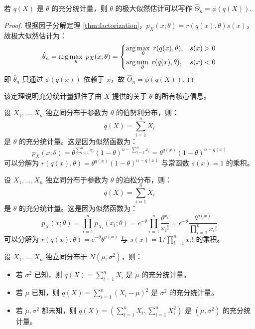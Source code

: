 \begin{theorem}
若 $q(X)$ 是 $\theta$ 的充分统计量，则 $\theta$ 的极大似然估计可以写作 $\hat\Theta_n=\phi(q(X))$.
\end{theorem}
\begin{proof}
根据因子分解定理 \ref{thm:factorization}，$p_X(x;\theta)=r(q(x),\theta)s(x)$，故极大似然估计为：
\[
\hat\theta_n=\arg\max_\theta\;p_X(x;\theta)=\begin{dcases}
    \arg\max_\theta\;r(q(x),\theta),&\text{$s(x)>0$}\\
    \arg\min_\theta\;r(q(x),\theta),&\text{$s(x)<0$}
\end{dcases}
\]
即 $\hat\theta_n$ 只通过 $\phi(q(x))$ 依赖于 $x$，故 $\hat\Theta_n=\phi(q(X))$.
\end{proof}
\begin{remark}
该定理说明充分统计量抓住了由 $X$ 提供的关于 $\theta$ 的所有核心信息。
\end{remark}

\begin{example}[伯努利分布]
设 $X_1,\ldots,X_n$ 独立同分布于参数为 $\theta$ 的伯努利分布，则：
\[
q(X)=\sum_{i=1}^nX_i
\]
是 $\theta$ 的充分统计量。这是因为似然函数为：
\[
p_X(x;\theta)=\theta^{\sum_{i=1}^n x_i}(1-\theta)^{n-\sum_{i=1}^nx_i}=\theta^{q(x)}(1-\theta)^{n-q(x)}
\]
可以分解为 $r(q(x),\theta)=\theta^{q(x)}(1-\theta)^{n-q(x)}$ 与常函数 $s(x)=1$ 的乘积。
\end{example}

\begin{example}[泊松分布]
设 $X_1,\ldots,X_n$ 独立同分布于参数为 $\theta$ 的泊松分布，则：
\[
q(X)=\sum_{i=1}^nX_i
\]
是 $\theta$ 的充分统计量。这是因为似然函数为：
\[
p_X(x;\theta)=\prod_{i=1}^np_{X_i}(x_i;\theta)=e^{-\theta}\prod_{i=1}^n\frac{\theta^{x_i}}{x_i!}=e^{-\theta}\frac{\theta^{q(x)}}{\prod_{i=1}^nx_i!}
\]
可以分解为 $r(q(x),\theta)=e^{-\theta}\theta^{q(x)}$ 与 $s(x)=1/\prod_{i=1}^nx_i!$ 的乘积。
\end{example}

\begin{example}[正态分布]
设 $X_1,\ldots,X_n$ 独立同分布于 $N(\mu,\sigma^2)$，则：
\begin{itemize}
    \item 若 $\sigma^2$ 已知，则 $q(X)=\sum_{i=1}^nX_i$ 是 $\mu$ 的充分统计量。
    \item 若 $\mu$ 已知，则 $q(X)=\sum_{i=1}^n(X_i-\mu)^2$ 是 $\sigma^2$ 的充分统计量。
    \item 若 $\mu,\sigma^2$ 都未知，则 $q(X)=(\sum_{i=1}^nX_i,\sum_{i=1}^nX_i^2)$ 是 $(\mu,\sigma^2)$ 的充分统计量。
\end{itemize}
\end{example}

